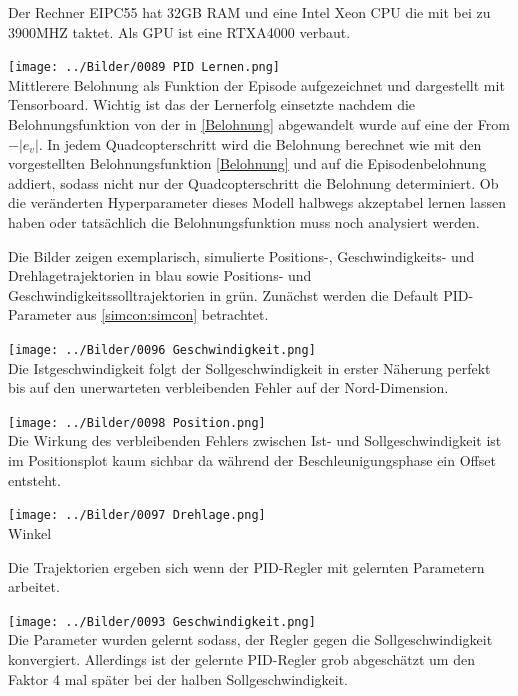 \vspace*{0.5cm}
Der Rechner EIPC55 hat 32GB RAM und eine Intel Xeon CPU die mit bei zu 3900MHZ taktet. Als GPU ist eine RTXA4000 verbaut.
\begin{center}
	\texttt{[image: ../Bilder/0089 PID Lernen.png]}{\\Mittlerere Belohnung als Funktion der Episode aufgezeichnet und dargestellt mit Tensorboard. Wichtig ist das der Lernerfolg einsetzte nachdem die Belohnungsfunktion von der in \ref{Belohnung} abgewandelt wurde auf eine der From $-|e_v|$. In jedem Quadcopterschritt wird die Belohnung berechnet wie mit den vorgestellten Belohnungsfunktion \ref{Belohnung} und auf die Episodenbelohnung addiert, sodass nicht nur der Quadcopterschritt die Belohnung determiniert. Ob die veränderten Hyperparameter dieses Modell halbwegs akzeptabel lernen lassen haben oder tatsächlich die Belohnungsfunktion muss noch analysiert werden.}
\end{center}
\pagebreak 
Die Bilder zeigen exemplarisch, simulierte Positions-, Geschwindigkeits- und Drehlagetrajektorien in blau sowie Positions- und Geschwindigkeitssolltrajektorien in grün. Zunächst werden die Default PID-Parameter aus \ref{simcon:simcon} betrachtet.
\begin{center}
	\texttt{[image: ../Bilder/0096 Geschwindigkeit.png]}{\\Die Istgeschwindigkeit folgt der Sollgeschwindigkeit in erster Näherung perfekt bis auf den unerwarteten verbleibenden Fehler auf der Nord-Dimension.}
\end{center}
\begin{center}
	\texttt{[image: ../Bilder/0098 Position.png]}{\\Die Wirkung des verbleibenden Fehlers zwischen Ist- und Sollgeschwindigkeit ist im Positionsplot kaum sichbar da während der Beschleunigungsphase ein Offset entsteht.}
\end{center}
\begin{center}
	\texttt{[image: ../Bilder/0097 Drehlage.png]}{\\Winkel}
\end{center}
\pagebreak
Die Trajektorien ergeben sich wenn der PID-Regler mit gelernten Parametern arbeitet.
\begin{center}
	\texttt{[image: ../Bilder/0093 Geschwindigkeit.png]}{\\Die Parameter wurden gelernt sodass, der Regler gegen die Sollgeschwindigkeit konvergiert. Allerdings ist der gelernte PID-Regler grob abgeschätzt um den Faktor 4 mal später bei der halben Sollgeschwindigkeit.}
\end{center}
